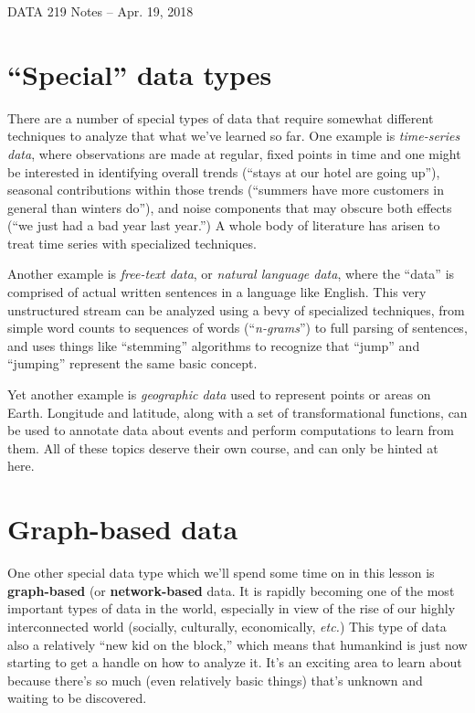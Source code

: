 \documentclass[12pt]{article}
\begin{document}
\begin{center}
\begin{Large}
DATA 219 Notes -- Apr. 19, 2018
\end{Large}
\end{center}

\section{``Special'' data types}

There are a number of special types of data that require somewhat different 
techniques to analyze that what we've learned so far. One example is
\textit{time-series data}, where observations are made at regular, fixed
points in time and one might be interested in identifying overall trends
(``stays at our hotel are going up''), seasonal contributions within those
trends (``summers have more customers in general than winters do''), and noise
components that may obscure both effects (``we just had a bad year last
year.'') A whole body of literature has arisen to treat time series with
specialized techniques.

Another example is \textit{free-text data}, or \textit{natural language data},
where the ``data'' is comprised of actual written sentences in a language like
English. This very unstructured stream can be analyzed using a bevy of
specialized techniques, from simple word counts to sequences of words
(``\textit{n-grams}'') to full parsing of sentences, and uses things like
``stemming'' algorithms to recognize that ``jump'' and ``jumping'' represent the
same basic concept.

Yet another example is \textit{geographic data} used to represent points or
areas on Earth. Longitude and latitude, along with a set of transformational
functions, can be used to annotate data about events and perform computations
to learn from them. All of these topics deserve their own course, and can only
be hinted at here.

\section{Graph-based data}

One other special data type which we'll spend some time on in this lesson is
\textbf{graph-based} (or \textbf{network-based} data. It is rapidly becoming
one of the most important types of data in the world, especially in view of
the rise of our highly interconnected world (socially, culturally,
economically, \textit{etc.}) This type of data also a relatively ``new kid on
the block,'' which means that humankind is just now starting to get a handle on
how to analyze it. It's an exciting area to learn about because there's so
much (even relatively basic things) that's unknown and waiting to be
discovered.
\end{document}
